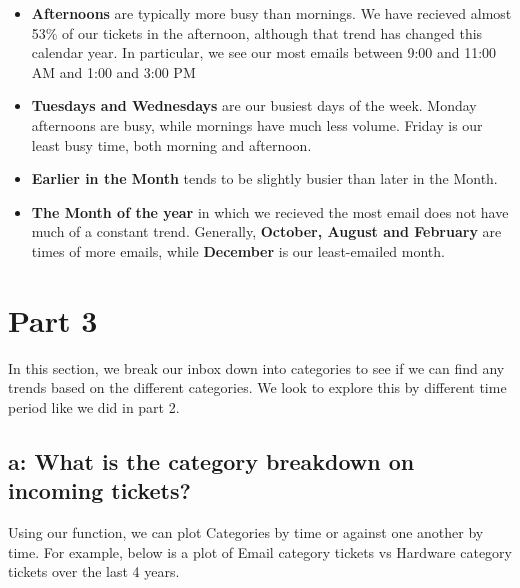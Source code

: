 \documentclass[11pt]{article}
\begin{document}
\begin{itemize}
\item
  \textbf{Afternoons} are typically more busy than mornings. We have
  recieved almost 53\% of our tickets in the afternoon, although that
  trend has changed this calendar year. In particular, we see our most
  emails between 9:00 and 11:00 AM and 1:00 and 3:00 PM
\item
  \textbf{Tuesdays and Wednesdays} are our busiest days of the week.
  Monday afternoons are busy, while mornings have much less volume.
  Friday is our least busy time, both morning and afternoon.
\item
  \textbf{Earlier in the Month} tends to be slightly busier than later
  in the Month.
\item
  \textbf{The Month of the year} in which we recieved the most email
  does not have much of a constant trend. Generally, \textbf{October,
  August and February} are times of more emails, while \textbf{December}
  is our least-emailed month.
\end{itemize}

    \hypertarget{part-3}{%
\section{Part 3}\label{part-3}}

In this section, we break our inbox down into categories to see if we
can find any trends based on the different categories. We look to
explore this by different time period like we did in part 2.

\hypertarget{a-what-is-the-category-breakdown-on-incoming-tickets}{%
\subsection{a: What is the category breakdown on incoming
tickets?}\label{a-what-is-the-category-breakdown-on-incoming-tickets}}

Using our function, we can plot Categories by time or against one
another by time. For example, below is a plot of Email category tickets
vs Hardware category tickets over the last 4 years.


    \begin{center}
    \end{center}
    { \hspace*{\fill} \\}
    
\end{document}
